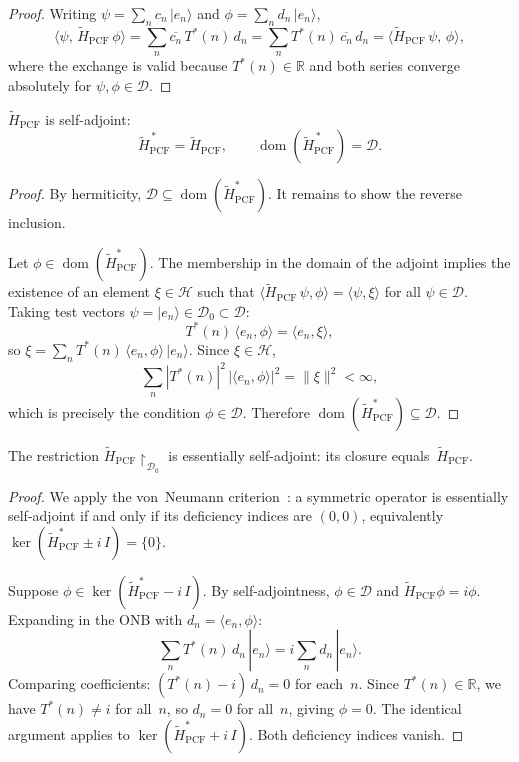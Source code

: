 \begin{proof}
Writing $\psi = \sum_n c_n\,|e_n\rangle$ and
$\phi = \sum_n d_n\,|e_n\rangle$,
\[
  \langle\psi,\,\tilde{H}_{\mathrm{PCF}}\,\phi\rangle
  = \sum_n \overline{c_n}\,T^*(n)\,d_n
  = \sum_n T^*(n)\,\overline{c_n}\,d_n
  = \langle\tilde{H}_{\mathrm{PCF}}\,\psi,\,\phi\rangle,
\]
where the exchange is valid because $T^*(n)\in\mathbb{R}$ and both
series converge absolutely for $\psi,\phi\in\mathcal{D}$.
\end{proof}

\begin{Theorem}\label{thm:self-adjoint}
$\tilde{H}_{\mathrm{PCF}}$ is self-adjoint:
\[
  \tilde{H}_{\mathrm{PCF}}^{\,*} = \tilde{H}_{\mathrm{PCF}},
  \qquad
  \operatorname{dom}(\tilde{H}_{\mathrm{PCF}}^{\,*}) = \mathcal{D}.
\]
\end{Theorem}

\begin{proof}
By hermiticity, $\mathcal{D}\subseteq\operatorname{dom}(\tilde{H}_{\mathrm{PCF}}^*)$.
It remains to show the reverse inclusion.

Let $\phi\in\operatorname{dom}(\tilde{H}_{\mathrm{PCF}}^*)$.  The membership in the domain of the adjoint
implies the existence of an element $\xi\in\mathcal{H}$ such that
$\langle\tilde{H}_{\mathrm{PCF}}\,\psi,\phi\rangle = \langle\psi,\xi\rangle$
for all $\psi\in\mathcal{D}$.  Taking test vectors
$\psi = |e_n\rangle \in \mathcal{D}_0 \subset \mathcal{D}$:
\[
  T^*(n)\,\langle e_n,\phi\rangle = \langle e_n,\xi\rangle,
\]
so $\xi = \sum_n T^*(n)\,\langle e_n,\phi\rangle\,|e_n\rangle$.
Since $\xi\in\mathcal{H}$,
\[
  \sum_n |T^*(n)|^2\,|\langle e_n,\phi\rangle|^2
  = \|\xi\|^2 < \infty,
\]
which is precisely the condition $\phi\in\mathcal{D}$.  Therefore
$\operatorname{dom}(\tilde{H}_{\mathrm{PCF}}^*)\subseteq\mathcal{D}$.
\end{proof}

\begin{Theorem}\label{thm:ess-sa}
The restriction
$\tilde{H}_{\mathrm{PCF}}\!\upharpoonright_{\mathcal{D}_0}$ is
essentially self-adjoint: its closure
equals~$\tilde{H}_{\mathrm{PCF}}$.
\end{Theorem}

\begin{proof}
We apply the von~Neumann criterion~\cite{vonneumann32}: a symmetric operator is essentially
self-adjoint if and only if its deficiency indices are $(0,0)$,
equivalently
$\ker(\tilde{H}_{\mathrm{PCF}}^* \pm i\,I) = \{0\}$.

Suppose $\phi\in\ker(\tilde{H}_{\mathrm{PCF}}^* - i\,I)$.  By
self-adjointness, $\phi\in\mathcal{D}$ and
$\tilde{H}_{\mathrm{PCF}}\phi = i\phi$.  Expanding in the ONB with
$d_n = \langle e_n,\phi\rangle$:
\[
  \sum_n T^*(n)\,d_n\,|e_n\rangle
  = i\sum_n d_n\,|e_n\rangle.
\]
Comparing coefficients: $(T^*(n) - i)\,d_n = 0$ for each~$n$.  Since
$T^*(n)\in\mathbb{R}$, we have $T^*(n)\neq i$ for all~$n$, so $d_n = 0$
for all~$n$, giving $\phi = 0$.  The identical argument applies to
$\ker(\tilde{H}_{\mathrm{PCF}}^* + i\,I)$.  Both deficiency indices
vanish.
\end{proof}


